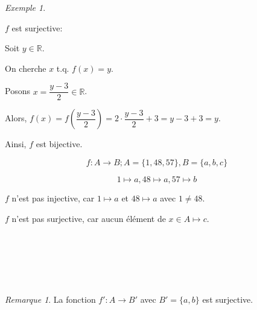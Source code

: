 \documentclass{report}
\newcommand*{\reels}{\mathbb{R}}
\theoremstyle{definition}
\theoremstyle{remark}
\newtheorem*{exem}{Exemple}
\newtheorem*{rema}{Remarque}
\begin{document}
\begin{exem}
\begin{ulist}
			$f$ est surjective:

			Soit $y \in \reels$.

			On cherche $x$ t.q. $f(x)=y$.

			Posons $x=\dfrac{y-3}{2} \in \reels$.

			Alors, $f(x) = f\left( \dfrac{y-3}{2} \right) = 2 \cdot  \dfrac{y-3}{2} + 3 = y-3+3 = y$.

			Ainsi, $f$ est bijective.

			\item
			\[
			f:A \to B; A=\{1,48,57\}, B=\{a,b,c\}
			\]

			\[
			1 \mapsto a, 48 \mapsto a, 57 \mapsto b
			\]

			$f$ n'est pas injective, car $1 \mapsto a$ et $48 \mapsto a$  avec $1 \neq 48$.

			$f$ n'est pas surjective, car aucun \'el\'ement de $x \in A \mapsto c$.
		\end{ulist}


		~



		~



		~


	\end{exem}

	\begin{rema}
		La fonction $f':A \to B'$ avec $B'=\{a,b\}$ est surjective.
	\end{rema}
\end{document}
